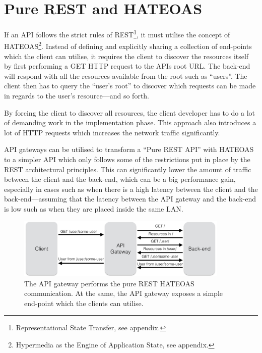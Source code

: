 \documentclass{cslthse-msc}
\begin{document}
\section{Pure REST and HATEOAS}
If an API follows the strict rules of REST\footnote{Representational State Transfer, see appendix.}, it must utilise the concept of HATEOAS\footnote{Hypermedia as the Engine of Application State, see appendix.}. Instead of defining and explicitly sharing a collection of end-points which the client can utilise, it requires the client to discover the resources itself by first performing a GET HTTP request to the APIs root URL. The back-end will respond with all the resources available from the root such as \enquote{users}. The client then has to query the \enquote{user's root} to discover which requests can be made in regards to the user's resource---and so forth. 

By forcing the client to discover all resources, the client developer has to do a lot of demanding work in the implementation phase\cite[page 62]{AASG}. This approach also introduces a lot of HTTP requests which increases the network traffic significantly.

API gateways can be utilised to transform a \enquote{Pure REST API} with HATEOAS to a simpler API which only follows some of the restrictions put in place by the REST architectural principles. This can significantly lower the amount of traffic between the client and the back-end, which can be a big performance gain, especially in cases such as when there is a high latency between the client and the back-end---assuming that the latency between the API gateway and the back-end is low such as when they are placed inside the same LAN.

\begin{figure}[H]
  \centering
    \begin{center}
      \includegraphics[width=0.9\textwidth]{images/api_gateway_hateoas.png}
    \end{center}
  \caption{The API gateway performs the pure REST HATEOAS communication. At the same, the API gateway exposes a simple end-point which the clients can utilise.}
\end{figure}
\end{document}
